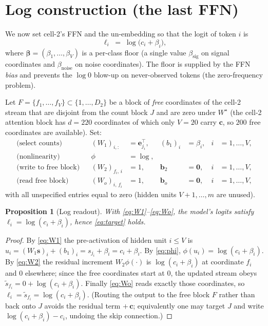 \documentclass[11pt]{article}
\newtheorem{proposition}{Proposition}
\theoremstyle{remark}
\newcommand{\ve}[1]{\bm{#1}}
\begin{document}
\section{Log construction (the last FFN)}\label{sec:log}

We now set cell-2's FFN and the un-embedding so that the logit of token $i$ is
\begin{equation}\label{eq:target}
\ell_i \;=\; \log\!\big(c_i+\beta_i\big),
\end{equation}
where $\ve\beta=(\beta_1,\dots,\beta_V)$ is a per-class floor (a single value
$\beta_{\mathrm{sig}}$ on signal coordinates and $\beta_{\mathrm{noise}}$ on noise
coordinates). The floor is supplied by the FFN \emph{bias} and prevents the
$\log 0$ blow-up on never-observed tokens (the zero-frequency problem).

Let $F=\{f_1,\dots,f_V\}\subset\{1,\dots,D_2\}$ be a block of \emph{free} coordinates of
the cell-2 stream that are disjoint from the count block $J$ and are zero under
$W^\star$ (the cell-2 attention block has $d=220$ coordinates of which only $V=20$ carry
$\ve c$, so $200$ free coordinates are available). Set:
\begin{align}
\text{(select counts)}&& (W_1)_{i,:} &= \ve e_{j_i}^{\!\top}, & (b_1)_i &= \beta_i, & i&=1,\dots,V,\label{eq:W1}\\
\text{(nonlinearity)}&& \phi &= \log, &&&& \label{eq:phi}\\
\text{(write to free block)}&& (W_2)_{f_i,\,i} &= 1, & \ve b_2 &= \ve 0, & i&=1,\dots,V,\label{eq:W2}\\
\text{(read free block)}&& (W_o)_{i,\,f_i} &= 1, & \ve b_o &= \ve 0, & i&=1,\dots,V,\label{eq:Wo}
\end{align}
with all unspecified entries equal to zero (hidden units $V{+}1,\dots,m$ are unused).

\begin{proposition}[Log readout]\label{prop:log}
With \eqref{eq:W1}--\eqref{eq:Wo}, the model's logits satisfy
$\ell_i=\log(c_i+\beta_i)$, hence \eqref{eq:target} holds.
\end{proposition}
\begin{proof}
By \eqref{eq:W1} the pre-activation of hidden unit $i\le V$ is
$u_i=(W_1\ve s)_i+(b_1)_i=s_{j_i}+\beta_i=c_i+\beta_i$. By \eqref{eq:phi},
$\phi(u_i)=\log(c_i+\beta_i)$. By \eqref{eq:W2} the residual increment
$W_2\phi(\cdot)$ is $\log(c_i+\beta_i)$ at coordinate $f_i$ and $0$ elsewhere; since the
free coordinates start at $0$, the updated stream obeys
$\tilde s_{f_i}=0+\log(c_i+\beta_i)$. Finally \eqref{eq:Wo} reads exactly those
coordinates, so $\ell_i=\tilde s_{f_i}=\log(c_i+\beta_i)$. (Routing the output to the
free block $F$ rather than back onto $J$ avoids the residual term $+\,\ve c$; equivalently
one may target $J$ and write $\log(c_i+\beta_i)-c_i$, undoing the skip connection.)
\end{proof}
\end{document}
